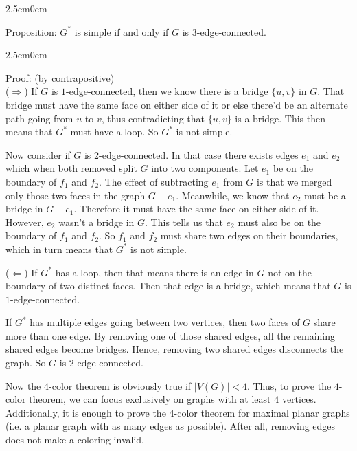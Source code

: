 \documentclass{book}
\newcommand{\hTwo}{%
   \color{MidnightBlue}%
   \fontsize{13}{15}\selectfont%
}
\newcommand{\hThree}{%
   \color{PineGreen}
   \fontsize{13}{15}\selectfont%
}
\newenvironment{myIndent}{%
   \begin{adjustwidth}{2.5em}{0em}%
}{%
   \end{adjustwidth}%
}
\newcommand{\uuline}[2][.]{%
{\vphantom{a}\color{#1}%
\rlap{\rule[-0.18em]{\widthof{#2}}{0.06em}}%
\rlap{\rule[-0.32em]{\widthof{#2}}{0.06em}}}%
#2}
\newcommand{\retTwo}{\hfill\bigbreak}
\begin{document}
{\begin{myIndent} \hTwo
   \uuline{Proposition}: $G^*$ is simple if and only if $G$ is $3$-edge-connected.

   {\begin{myIndent} \hThree
      Proof: (by contrapositive)\\
      ($\Longrightarrow$) If $G$ is $1$-edge-connected, then we know there is a bridge $\{u, v\}$ in $G$. That bridge must have the same face on either side of it or else there'd be an alternate path going from $u$ to $v$, thus contradicting that $\{u, v\}$ is a bridge. This then means that $G^*$ must have a loop. So $G^*$ is not simple.\retTwo

      Now consider if $G$ is $2$-edge-connected. In that case there exists edges $e_1$ and $e_2$ which when both removed split $G$ into two components. Let $e_1$ be on the boundary of $f_1$ and $f_2$. The effect of subtracting $e_1$ from $G$ is that we merged only those two faces in the graph $G - e_1$. Meanwhile, we know that $e_2$ must be a bridge in $G - e_1$. Therefore it must have the same face on either side of it. However, $e_2$ wasn't a bridge in $G$. This tells us that $e_2$ must also be on the boundary of $f_1$ and $f_2$. So $f_1$ and $f_2$ must share two edges on their boundaries, which in turn means  that $G^*$ is not simple.\retTwo

      ($\Longleftarrow$) If $G^*$ has a loop, then that means there is an edge in $G$ not on the boundary of two distinct faces. Then that edge is a bridge, which means that $G$ is $1$-edge-connected.\retTwo

      If $G^*$ has multiple edges going between two vertices, then two faces of $G$ share more than one edge. By removing one of those shared edges, all the remaining shared edges become bridges. Hence, removing two shared edges disconnects the graph. So $G$ is $2$-edge connected.
   \end{myIndent}}
\end{myIndent}}

\newpage

Now the $4$-color theorem is obviously true if $|V(G)| < 4$. Thus, to prove the $4$-color theorem, we can focus exclusively on graphs with at least $4$ vertices. Additionally, it is enough to prove the $4$-color theorem for maximal planar graphs (i.e. a planar graph with as many edges as possible). After all, removing edges does not make a coloring invalid.\retTwo
\end{document}

